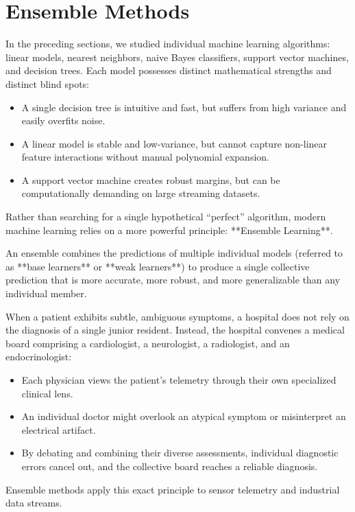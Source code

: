\section{Ensemble Methods}\label{sec:ensembles}

In the preceding sections, we studied individual machine learning algorithms: linear models, nearest neighbors, naive Bayes classifiers, support vector machines, and decision trees. Each model possesses distinct mathematical strengths and distinct blind spots:
\begin{itemize}
    \item A single decision tree is intuitive and fast, but suffers from high variance and easily overfits noise.
    \item A linear model is stable and low-variance, but cannot capture non-linear feature interactions without manual polynomial expansion.
    \item A support vector machine creates robust margins, but can be computationally demanding on large streaming datasets.
\end{itemize}

Rather than searching for a single hypothetical ``perfect'' algorithm, modern machine learning relies on a more powerful principle: **Ensemble Learning**. 

An ensemble combines the predictions of multiple individual models (referred to as **base learners** or **weak learners**) to produce a single collective prediction that is more accurate, more robust, and more generalizable than any individual member.

\begin{analogy}
When a patient exhibits subtle, ambiguous symptoms, a hospital does not rely on the diagnosis of a single junior resident. Instead, the hospital convenes a medical board comprising a cardiologist, a neurologist, a radiologist, and an endocrinologist:
\begin{itemize}
    \item Each physician views the patient's telemetry through their own specialized clinical lens.
    \item An individual doctor might overlook an atypical symptom or misinterpret an electrical artifact.
    \item By debating and combining their diverse assessments, individual diagnostic errors cancel out, and the collective board reaches a reliable diagnosis.
\end{itemize}
Ensemble methods apply this exact principle to sensor telemetry and industrial data streams.
\end{analogy}

